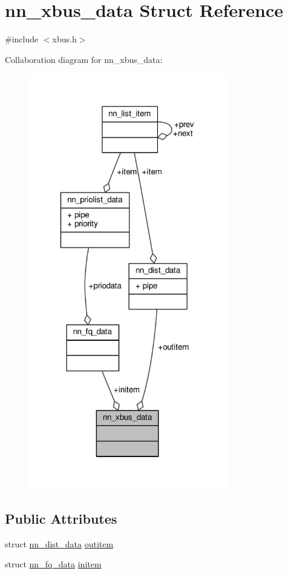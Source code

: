 \hypertarget{structnn__xbus__data}{}\section{nn\+\_\+xbus\+\_\+data Struct Reference}
\label{structnn__xbus__data}


{\ttfamily \#include $<$xbus.\+h$>$}



Collaboration diagram for nn\+\_\+xbus\+\_\+data\+:\nopagebreak
\begin{figure}[H]
\begin{center}
\leavevmode
\includegraphics[width=245pt]{structnn__xbus__data__coll__graph}
\end{center}
\end{figure}
\subsection*{Public Attributes}
\begin{DoxyCompactItemize}
\item 
struct \hyperlink{structnn__dist__data}{nn\+\_\+dist\+\_\+data} \hyperlink{structnn__xbus__data_a947f1c64e4775f7e7091a1022ce1aac8}{outitem}
\item 
struct \hyperlink{structnn__fq__data}{nn\+\_\+fq\+\_\+data} \hyperlink{structnn__xbus__data_ad348aae27eb3db4c91f565ff8f48cf25}{initem}
\end{DoxyCompactItemize}


